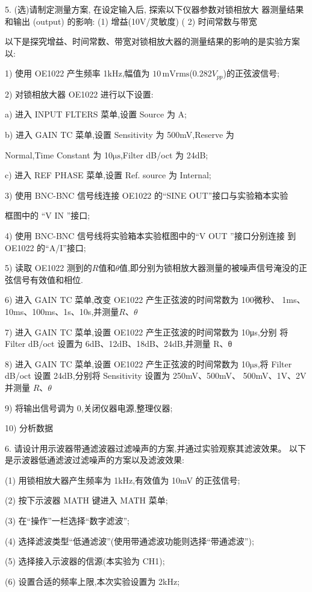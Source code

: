 \documentclass[11pt,a4paper]{ctexart}
\begin{document}
5. (选)请制定测量方案, 在设定输入后, 探索以下仪器参数对锁相放大
器测量结果和输出
(output) 的影响:
(1) 增益(10V/灵敏度)
( 2) 时间常数与带宽

以下是探究增益、时间常数、带宽对锁相放大器的测量结果的影响的是实验方案以:

1) 使用 OE1022 产生频率 1kHz,幅值为 $10\,\mathrm{mVrms}$(0.282$V_{pp}$)的正弦波信号;

2) 对锁相放大器 OE1022 进行以下设置:

a) 进入 INPUT FLTERS 菜单,设置 Source 为 A;

b) 进入 GAIN TC 菜单,设置 Sensitivity 为 500mV,Reserve 为

Normal,Time Constant 为 10$\mathrm{\mu s}$,Filter dB/oct 为 24dB;

c) 进入 REF PHASE 菜单,设置 Ref. source 为 Internal;

3) 使用 BNC-BNC 信号线连接 OE1022 的“SINE OUT”接口与实验箱本实验

框图中的 “V IN ”接口;

4) 使用 BNC-BNC 信号线将实验箱本实验框图中的“V OUT ”接口分别连接 到
OE1022 的“A/I”接口;

5) 读取 OE1022 测到的$R$值和$\theta$值,即分别为锁相放大器测量的被噪声信号淹没的正弦信号有效值和相位.

6) 进入 GAIN TC 菜单,改变 OE1022 产生正弦波的时间常数为 100微秒、 1ms、
10ms、100ms、1s、10s,并测量$R$、$\theta$

7) 进入 GAIN TC 菜单,设置 OE1022 产生正弦波的时间常数为 10μs,分别
将 Filter dB/oct 设置为 6dB、12dB、18dB、24dB,并测量 R、θ 

8) 进入 GAIN TC 菜单,设置 OE1022 产生正弦波的时间常数为 10$\mathrm{\mu s}$,将
Filter dB/oct 设置 24dB,分别将 Sensitivity 设置为 250mV、500mV、
500mV、1V、2V 并测量 $R$、$\theta$ 

9) 将输出信号调为 0,关闭仪器电源,整理仪器;

10) 分析数据

6. 请设计用示波器带通滤波器过滤噪声的方案,并通过实验观察其滤波效果。
以下是示波器低通滤波过滤噪声的方案以及滤波效果:

(1) 用锁相放大器产生频率为 1kHz,有效值为 10mV 的正弦信号;

(2) 按下示波器 MATH 键进入 MATH 菜单;

(3) 在“操作”一栏选择“数字滤波”;

(4) 选择滤波类型“低通滤波”(使用带通滤波功能则选择“带通滤波”);

(5) 选择接入示波器的信源(本实验为 CH1);

(6) 设置合适的频率上限,本次实验设置为 2kHz;
\end{document}

